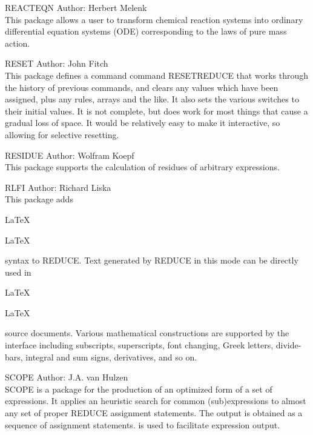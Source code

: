 \begin{Package}{REACTEQN}
Author: Herbert Melenk\\

This package allows a user to transform chemical reaction systems into
ordinary differential equation systems (ODE) corresponding to the laws of
pure mass action.
\end{Package}

\begin{Package}{RESET}
Author: John Fitch\\

This package defines a command command RESETREDUCE that works through the
history of previous commands, and clears any values which have been
assigned, plus any rules, arrays and the like.  It also sets the various
switches to their initial values.  It is not complete, but does work for
most things that cause a gradual loss of space.  It would be relatively
easy to make it interactive, so allowing for selective resetting.
\end{Package}

\begin{Package}{RESIDUE}
Author: Wolfram Koepf\\

This package supports the calculation of residues of arbitrary
expressions.
\end{Package}

\begin{Package}{RLFI}
Author: Richard Liska\\

This package
adds \begin{TEX}\LaTeX \end{TEX}\begin{INFO}LaTeX \end{INFO} syntax
to REDUCE.  Text generated by REDUCE in this mode can be directly
used in \begin{TEX}\LaTeX \end{TEX} \begin{INFO}LaTeX \end{INFO} source
documents.  Various
mathematical constructions are supported by the interface including
subscripts, superscripts, font changing, Greek letters, divide-bars,
integral and sum signs, derivatives, and so on.
\end{Package}

\begin{Package}{SCOPE}
Author: J.A. van Hulzen\\

SCOPE is a package for the production of an optimized form of a set of
expressions.  It applies an heuristic search for common (sub)expressions
to almost any set of proper REDUCE assignment statements.  The output is
obtained as a sequence of assignment statements.   is used to
facilitate expression output.
\end{Package}


